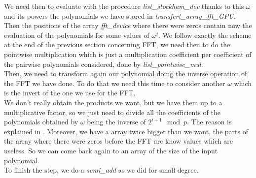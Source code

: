 We need then to evaluate with the procedure \textit{list\_stockham\_dev} thanks to this $\omega$ and its powers the polynomials we have stored in \textit{transfert\_array\_fft\_GPU}. Then the positions of the array \textit{fft\_device} where there were zeros contain now the evaluation of the polynomials for some values of $\omega^{j}$. We follow exactly the scheme at the end of the previous section concerning FFT, we need then to do the pointwise multiplication which is just a multiplication coefficient per coefficient of the pairwise polynomials considered, done by \textit{list\_pointwise\_mul}. \\

Then, we need to transform again our polynomial doing the inverse operation of the FFT we have done. To do that we need this time to consider another $\omega$ which is the invert of the one we use for the FFT.\\

We don't really obtain the products we want, but we have them up to a multiplicative factor, so we just need to divide all the coefficients of the polynomials obtained by $\omega$ being the inverse of $2^{i+1} \mod p$. The reason is explained in \cite{FastMulMMM}. Moreover, we have a array twice bigger than we want, the parts of the array where there were zeros before the FFT are know values which are useless. So we can come back again to an array of the size of the input polynomial.\\

To finish the step, we do a \textit{semi\_add} as we did for small degree.
